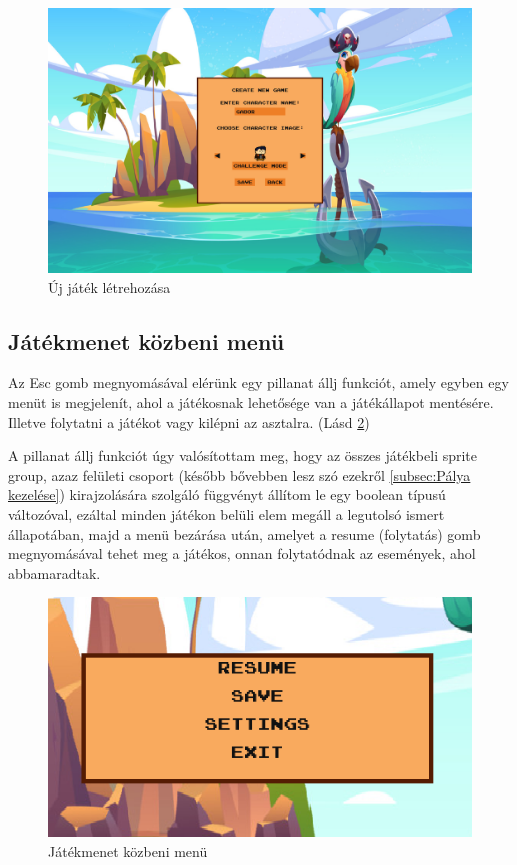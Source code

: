\begin{figure}[H]
    \centering
    \includegraphics[width=14.0truecm]{images/newgame.png}
    \caption{Új játék létrehozása}
    \label{fig:Új játék létrehozása}
\end{figure}

\subsection{Játékmenet közbeni menü}
 Az Esc gomb megnyomásával elérünk egy pillanat állj funkciót, amely egyben egy menüt is megjelenít, ahol a játékosnak lehetősége van a játékállapot mentésére. Illetve folytatni a játékot vagy kilépni az asztalra. (Lásd \ref{fig:Játékmenet közbeni menü})

A pillanat állj funkciót úgy valósítottam meg, hogy az összes játékbeli sprite group, azaz felületi csoport (később bővebben lesz szó ezekről \ref{subsec:Pálya kezelése}) kirajzolására szolgáló függvényt állítom le egy boolean típusú változóval, ezáltal minden játékon belüli elem megáll a legutolsó ismert állapotában, majd a menü bezárása után, amelyet a resume (folytatás) gomb megnyomásával tehet meg a játékos, onnan folytatódnak az események, ahol abbamaradtak.


\begin{figure}[H]
    \centering
    \includegraphics[width=12.0truecm]{images/ingamemenu.png}
    \caption{Játékmenet közbeni menü}
    \label{fig:Játékmenet közbeni menü}
\end{figure}

